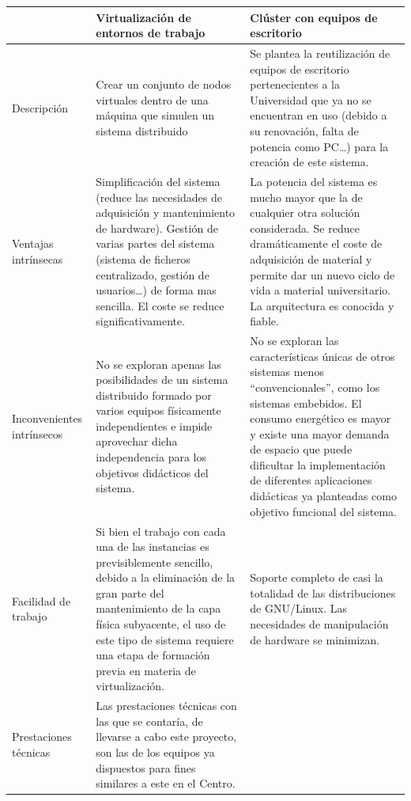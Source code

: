 \begin{table}
\begin{tabular}{|p{2.3cm}|p{6.5cm}|p{6.5cm}|}
\hline
&\textbf{Virtualización de entornos de trabajo}&\textbf{Clúster con equipos de escritorio}\\%
\hline
Descripción&Crear un conjunto de nodos virtuales dentro de una máquina que simulen un sistema distribuido&Se plantea la reutilización de equipos de escritorio pertenecientes a la Universidad que ya no se encuentran en uso (debido a su renovación, falta de potencia como PC\dots) para la creación de este sistema.\\
\hline
Ventajas intrínsecas&Simplificación del sistema (reduce las necesidades de adquisición y mantenimiento de hardware). Gestión de varias partes del sistema (sistema de ficheros centralizado, gestión de usuarios\dots) de forma mas sencilla. El coste se reduce significativamente.&La potencia del sistema es mucho mayor que la de cualquier otra solución considerada. Se reduce dramáticamente el coste de adquisición de material y permite dar un nuevo ciclo de vida a material universitario. La arquitectura es conocida y fiable.\\
\hline
Inconvenientes intrínsecos&No se exploran apenas las posibilidades de un sistema distribuido formado por varios equipos físicamente independientes e impide aprovechar dicha independencia para los objetivos didácticos del sistema.&No se exploran las características únicas de otros sistemas menos ``convencionales'', como los sistemas embebidos. El consumo energético es mayor y existe una mayor demanda de espacio que puede dificultar la implementación de diferentes aplicaciones didácticas ya planteadas como objetivo funcional del sistema.
\\
\hline
Facilidad de trabajo&Si bien el trabajo con cada una de las instancias es previsiblemente sencillo, debido a la eliminación de la gran parte del mantenimiento de la capa física subyacente, el uso de este tipo de sistema requiere una etapa de formación previa en materia de virtualización.&Soporte completo de casi la totalidad de las distribuciones de GNU/Linux. Las necesidades de manipulación de hardware se minimizan.\\
\hline
Prestaciones técnicas&Las prestaciones técnicas con las que se contaría, de llevarse a cabo este proyecto, son las de los equipos ya dispuestos para fines similares a este en el Centro.&\begin{itemize}[noitemsep]

\end{itemize}
\end{tabular}
\end{table}
